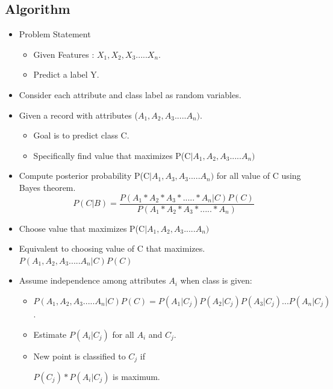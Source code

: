 \subsection{Algorithm}
\begin{itemize}
\item Problem Statement

\begin{itemize}
 \item Given Features : $X_1,X_2,X_3.....X_n.$
 \item Predict a label Y.
\end{itemize}

\item Consider each attribute and class label as random variables.
\item Given a record with attributes ($A_1,A_2,A_3.....A_n)$.
\begin{itemize}
\item Goal is to predict class C.
\item Specifically find value that maximizes P(C$|A_1,A_2,A_3.....A_n)$
\end{itemize}
\item Compute posterior probability P(C$|A_1,A_3,A_3.....A_n)$ for all value of C using Bayes theorem.
\[P(C|B)=\frac{P(A_1*A_2*A_3*.....*A_n|C)P(C)}{P(A_1*A_2*A_3*.....*A_n)}\]
\item Choose value that maximizes P(C$|A_1,A_2,A_3.....A_n)$
\item Equivalent to choosing value of C that maximizes.
$P(A_1,A_2,A_3.....A_n|C)P(C)$

\item Assume independence among attributes $A_i$ when class is given:
\begin{itemize}
\item $P(A_1,A_2,A_3.....A_n|C)P(C)=P(A_1|C_j)P(A_2|C_j)P(A_3|C_j)...P(A_n|C_j)$.
\item Estimate $P(A_i|C_j)$ for all $A_i$ and $C_j$.
\item New point is classified to $C_j$ if
\par 
$P(C_j)*P(A_i|C_j)$ is maximum.
\end{itemize}

\end{itemize}
\newpage

